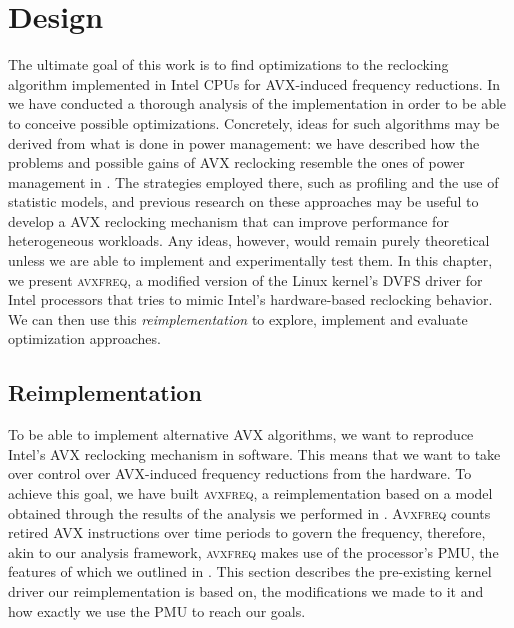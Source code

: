 \chapter{Design}
\label{sec:design}

The ultimate goal of this work is to find optimizations to the reclocking algorithm implemented in Intel \glspl{CPU} for \gls{AVX}-induced frequency reductions. In  we have conducted a thorough analysis of the implementation in order to be able to conceive possible optimizations. Concretely, ideas for such algorithms may be derived from what is done in power management: we have described how the problems and possible gains of \gls{AVX} reclocking resemble the ones of power management in . The strategies employed there, such as profiling and the use of statistic models, and previous research on these approaches may be useful to develop a \gls{AVX} reclocking mechanism that can improve performance for heterogeneous workloads. Any ideas, however, would remain purely theoretical unless we are able to implement and experimentally test them. In this chapter, we present \textsc{avxfreq}, a modified version of the Linux kernel's \gls{DVFS} driver for Intel processors that tries to mimic Intel's hardware-based reclocking behavior. We can then use this \emph{reimplementation} to explore, implement and evaluate optimization approaches.

\section{Reimplementation}
\label{sec:design:reimplementation}

To be able to implement alternative \gls{AVX} algorithms, we want to reproduce Intel's \gls{AVX} reclocking mechanism in software. This means that we want to take over control over \gls{AVX}-induced frequency reductions from the hardware. To achieve this goal, we have built \textsc{avxfreq}, a reimplementation based on a model obtained through the results of the analysis we performed in . \textsc{Avxfreq} counts retired \gls{AVX} instructions over time periods to govern the frequency, therefore, akin to our analysis framework, \textsc{avxfreq} makes use of the processor's \gls{PMU}, the features of which we outlined in . This section describes the pre-existing kernel driver our reimplementation is based on, the modifications we made to it and how exactly we use the \gls{PMU} to reach our goals.

